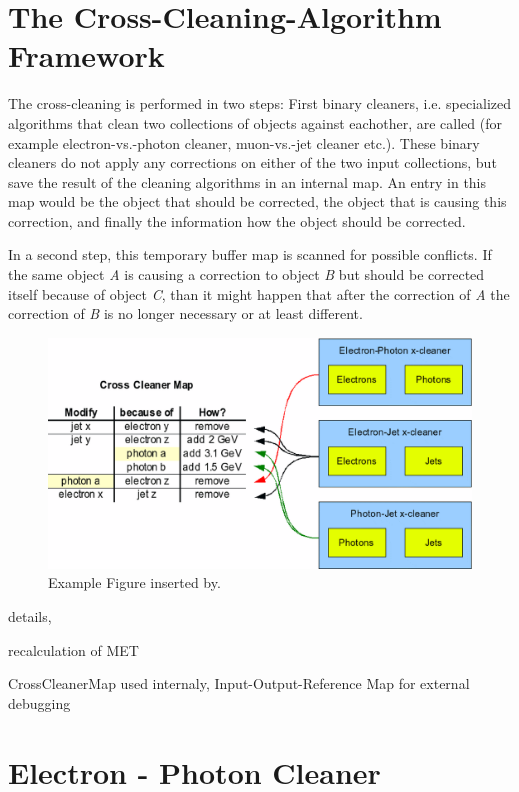 \documentclass{cmspaper}
\begin{document}
\section{The Cross-Cleaning-Algorithm Framework}
The cross-cleaning is performed in two steps: First binary cleaners, i.e.
specialized algorithms that clean two collections of objects against eachother,
are called (for example electron-vs.-photon cleaner, muon-vs.-jet cleaner etc.).
These binary cleaners do not apply any corrections on either of the two input
collections, but save the result of the cleaning algorithms in an internal map.
An entry in this map would be the object that should be corrected, the object
that is causing this correction, and finally the information how the object
should be corrected.

In a second step, this temporary buffer map is scanned for possible conflicts.
If the same object {\it A} is causing a correction to object {\it B} but should
be corrected itself because of object {\it C}, than it might happen that after
the correction of {\it A} the correction of {\it B} is no longer necessary or at
least different.

\begin{figure}[hbtp]
  \begin{center}
    \includegraphics[scale=.4]{CleaningMap.eps}
    \caption{Example Figure inserted by.}
    \label{fig:Cleaning}
  \end{center}
\end{figure}


details,

recalculation of MET

CrossCleanerMap used internaly, Input-Output-Reference Map for external
debugging

\section{Electron - Photon Cleaner}
\end{document}
